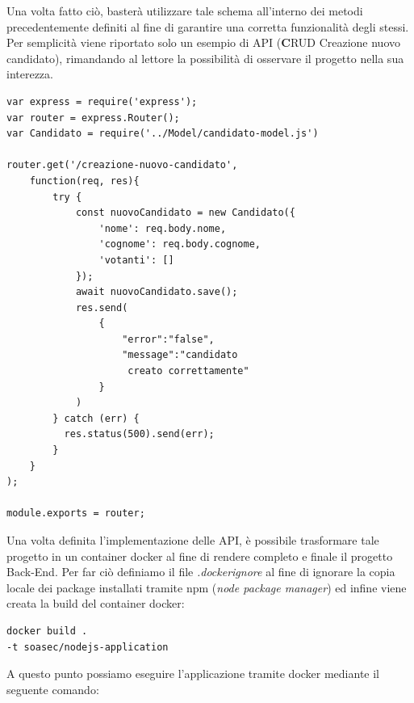\documentclass[twoside]{report}
\begin{document}
Una volta fatto ciò, basterà utilizzare tale schema all'interno dei metodi precedentemente definiti al fine di garantire una corretta funzionalità degli stessi.
\bigbreak
Per semplicità viene riportato solo un esempio di API (\textbf{C}RUD Creazione nuovo candidato), rimandando al lettore la possibilità di osservare il progetto nella sua interezza.

\begin{listing}[h!]
\begin{verbatim}
var express = require('express');
var router = express.Router();
var Candidato = require('../Model/candidato-model.js')

router.get('/creazione-nuovo-candidato', 
    function(req, res){
        try {
            const nuovoCandidato = new Candidato({
                'nome': req.body.nome,
                'cognome': req.body.cognome,
                'votanti': []
            });
            await nuovoCandidato.save();
            res.send(
                {
                    "error":"false",
                    "message":"candidato
                     creato correttamente"
                }
            )
        } catch (err) {
          res.status(500).send(err);
        }
    }
);

module.exports = router;
\end{verbatim}
\end{listing}
\FloatBarrier

Una volta definita l'implementazione delle API, è possibile trasformare tale progetto in un container docker al fine di rendere completo e finale il progetto Back-End.
\bigbreak
Per far ciò definiamo il file \textit{.dockerignore} al fine di ignorare la copia locale dei package installati tramite npm (\textit{node package manager}) ed infine viene creata la build del container docker:

\begin{listing}[h!]
\begin{verbatim}
docker build . 
-t soasec/nodejs-application
\end{verbatim}
\end{listing}
\FloatBarrier

A questo punto possiamo eseguire l'applicazione tramite docker mediante il seguente comando:
\end{document}
